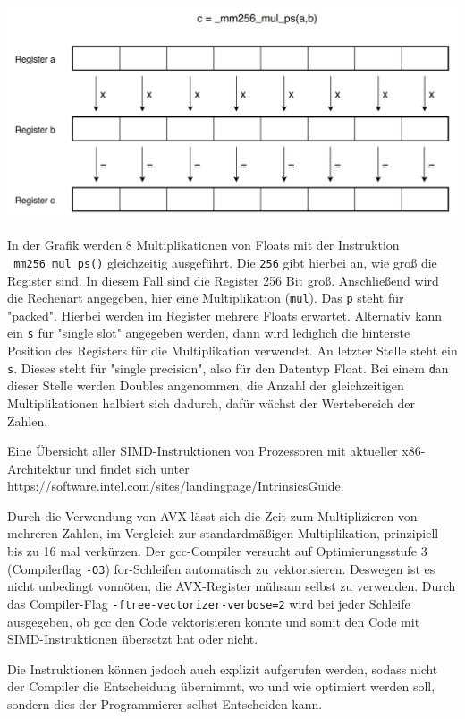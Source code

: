 \documentclass[../main.tex]{subfiles}
\begin{document}
\includegraphics[width=\textwidth]{../images/Benz/avx.png}

In der Grafik werden 8 Multiplikationen von Floats mit der Instruktion \texttt{\_mm256\_mul\_ps()} gleichzeitig ausgeführt. Die \texttt{256} gibt hierbei an, wie groß die Register sind. In diesem Fall sind die Register 256 Bit groß. Anschließend wird die Rechenart angegeben, hier eine Multiplikation (\texttt{mul}). Das \texttt{p} steht für "packed". Hierbei werden im Register mehrere Floats erwartet. Alternativ kann ein \texttt{s} für "single slot" angegeben werden, dann wird lediglich die hinterste Position des Registers für die Multiplikation verwendet. An letzter Stelle steht ein \texttt{s}. Dieses steht für "single precision", also für den Datentyp Float. Bei einem \texttt{d}an dieser Stelle werden Doubles angenommen, die Anzahl der gleichzeitigen Multiplikationen halbiert sich dadurch, dafür wächst der Wertebereich der Zahlen.

Eine Übersicht aller SIMD-Instruktionen von Prozessoren mit aktueller x86-Architektur und findet sich unter \url{https://software.intel.com/sites/landingpage/IntrinsicsGuide}. 

Durch die Verwendung von AVX lässt sich die Zeit zum Multiplizieren von mehreren Zahlen, im Vergleich zur standardmäßigen Multiplikation, prinzipiell bis zu 16 mal verkürzen. Der gcc-Compiler versucht auf Optimierungsstufe 3 (Compilerflag \texttt{-O3}) for-Schleifen automatisch zu vektorisieren. Deswegen ist es nicht unbedingt vonnöten, die AVX-Register mühsam selbst zu verwenden. Durch das Compiler-Flag \texttt{-ftree-vectorizer-verbose=2} wird bei jeder Schleife ausgegeben, ob gcc den Code vektorisieren konnte und somit den Code mit SIMD-Instruktionen übersetzt hat oder nicht.

Die Instruktionen können jedoch auch explizit aufgerufen werden, sodass nicht der Compiler die Entscheidung übernimmt, wo und wie optimiert werden soll, sondern dies der Programmierer selbst Entscheiden kann. 
\end{document}
